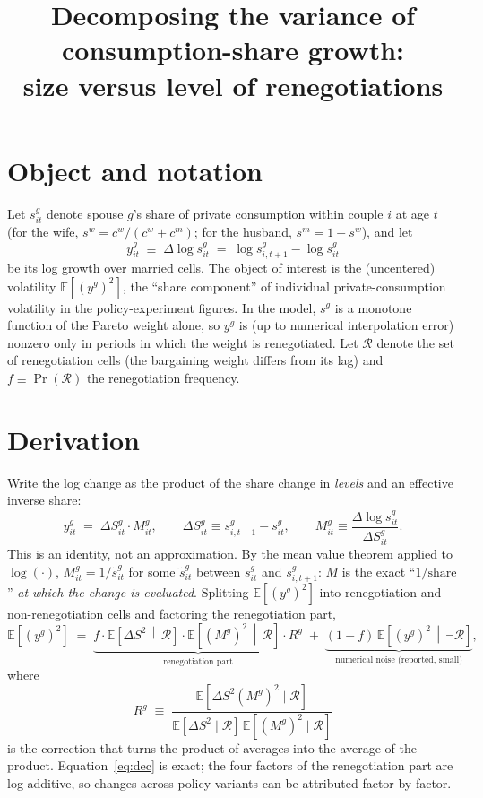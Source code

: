 \documentclass[11pt]{article}
\title{Decomposing the variance of consumption-share growth:\\ size versus level of renegotiations}
\author{}
\date{}
\newcommand{\E}{\mathbb{E}}
\newcommand{\ren}{\mathcal{R}}
\begin{document}
\maketitle

\section{Object and notation}

Let $s^g_{it}$ denote spouse $g$'s share of private consumption within
couple $i$ at age $t$ (for the wife, $s^w = c^w/(c^w+c^m)$; for the husband,
$s^m = 1-s^w$), and let
\[
y^g_{it} \;\equiv\; \Delta \log s^g_{it} \;=\; \log s^g_{i,t+1}-\log s^g_{it}
\]
be its log growth over married cells. The object of interest is the
(uncentered) volatility $\E\!\left[(y^g)^2\right]$, the ``share component''
of individual private-consumption volatility in the policy-experiment
figures. In the model, $s^g$ is a monotone function of the Pareto weight
alone, so $y^g$ is (up to numerical interpolation error) nonzero only in
periods in which the weight is renegotiated. Let $\ren$ denote the set of
renegotiation cells (the bargaining weight differs from its lag) and
$f \equiv \Pr(\ren)$ the renegotiation frequency.

\section{Derivation}

Write the log change as the product of the share change in \emph{levels}
and an effective inverse share:
\[
y^g_{it} \;=\; \Delta S^g_{it}\cdot M^g_{it},
\qquad
\Delta S^g_{it} \equiv s^g_{i,t+1}-s^g_{it},
\qquad
M^g_{it} \equiv \frac{\Delta \log s^g_{it}}{\Delta S^g_{it}} .
\]
This is an identity, not an approximation. By the mean value theorem applied
to $\log(\cdot)$, $M^g_{it} = 1/\tilde{s}^g_{it}$ for some
$\tilde{s}^g_{it}$ between $s^g_{it}$ and $s^g_{i,t+1}$: $M$ is the exact
``$1/\text{share}$'' \emph{at which the change is evaluated}. Splitting
$\E[(y^g)^2]$ into renegotiation and non-renegotiation cells and factoring
the renegotiation part,
\begin{equation}
\E\!\left[(y^g)^2\right]
\;=\;
\underbrace{f \cdot
\E\!\left[\Delta S^2 \,\middle|\, \ren\right]\cdot
\E\!\left[(M^g)^2 \,\middle|\, \ren\right]\cdot
R^g}_{\text{renegotiation part}}
\;+\;
\underbrace{(1-f)\,\E\!\left[(y^g)^2 \,\middle|\, \neg\ren\right]}_{\text{numerical noise (reported, small)}},
\label{eq:dec}
\end{equation}
where
\[
R^g \;\equiv\;
\frac{\E\!\left[\Delta S^2 (M^g)^2 \mid \ren\right]}
     {\E\!\left[\Delta S^2 \mid \ren\right]\,\E\!\left[(M^g)^2 \mid \ren\right]}
\]
is the correction that turns the product of averages into the average of the
product. Equation~\eqref{eq:dec} is exact; the four factors of the
renegotiation part are log-additive, so changes across policy variants can
be attributed factor by factor.
\end{document}
